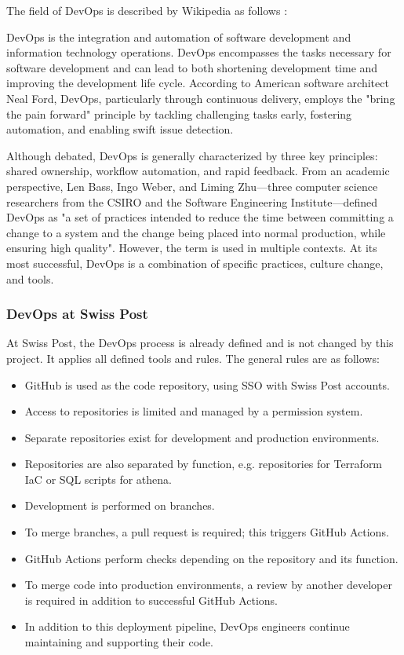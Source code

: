 The field of DevOps is described by Wikipedia as follows \cite{enwiki:1362982395}:

DevOps is the integration and automation of software development and information technology operations. DevOps encompasses the tasks necessary for software development and can lead to both shortening development time and improving the development life cycle. According to American software architect Neal Ford, DevOps, particularly through continuous delivery, employs the "bring the pain forward" principle by tackling challenging tasks early, fostering automation, and enabling swift issue detection.

Although debated, DevOps is generally characterized by three key principles: shared ownership, workflow automation, and rapid feedback. From an academic perspective, Len Bass, Ingo Weber, and Liming Zhu—three computer science researchers from the CSIRO and the Software Engineering Institute—defined DevOps as "a set of practices intended to reduce the time between committing a change to a system and the change being placed into normal production, while ensuring high quality". However, the term is used in multiple contexts. At its most successful, DevOps is a combination of specific practices, culture change, and tools.



\subsubsection*{DevOps at Swiss Post}

At Swiss Post, the DevOps process is already defined and is not changed by this project. It applies all defined tools and rules. The general rules are as follows:

\begin{itemize}
    \item GitHub is used as the code repository, using SSO with Swiss Post accounts.
    \item Access to repositories is limited and managed by a permission system.
    \item Separate repositories exist for development and production environments.
    \item Repositories are also separated by function, e.g. repositories for Terraform \gls{IaC} or SQL scripts for \gls{athena}.
    \item Development is performed on branches.
    \item To merge branches, a pull request is required; this triggers GitHub Actions.
    \item GitHub Actions perform checks depending on the repository and its function.
    \item To merge code into production environments, a review by another developer is required in addition to successful GitHub Actions.
    \item In addition to this deployment pipeline, DevOps engineers continue maintaining and supporting their code.
\end{itemize}




